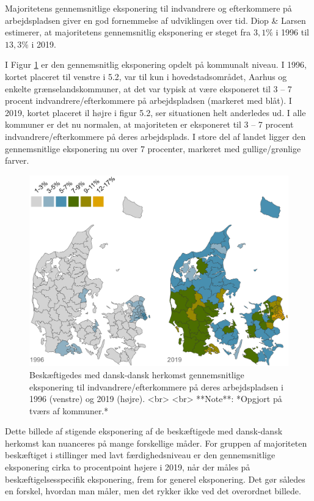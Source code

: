 \documentclass[
]{book}
\begin{document}
Majoritetens gennemsnitlige eksponering til indvandrere og efterkommere på arbejdspladsen giver en god fornemmelse af udviklingen over tid. Diop \& Larsen estimerer, at majoritetens gennemsnitlig eksponering er steget fra \(3,1\%\) i 1996 til \(13,3\%\) i 2019.

I Figur \ref{fig:fig-5-2} er den gennemsnitlig eksponering opdelt på kommunalt niveau. I 1996, kortet placeret til venstre i 5.2, var til kun i hovedstadsområdet, Aarhus og enkelte grænselandskommuner, at det var typisk at være eksponeret til 3 -- 7 procent indvandrere/efterkommere på arbejdspladsen (markeret med blåt). I 2019, kortet placeret il højre i figur 5.2, ser situationen helt anderledes ud. I alle kommuner er det nu normalen, at majoriteten er eksponeret til 3 -- 7 procent indvandrere/efterkommere på deres arbejdsplads. I store del af landet ligger den gennemsnitlige eksponering nu over 7 procenter, markeret med gullige/grønlige farver.

\begin{figure}
\includegraphics[width=1\linewidth]{images/Figur_4_1} \caption{Beskæftigedes med dansk-dansk herkomst gennemsnitlige eksponering til indvandrere/efterkommere på deres arbejdspladsen i 1996 (venstre) og 2019 (højre). <br> <br> **Note**: *Opgjort på tværs af kommuner.*}\label{fig:fig-5-2}
\end{figure}

Dette billede af stigende eksponering af de beskæftigede med dansk-dansk herkomst kan nuanceres på mange forskellige måder. For gruppen af majoriteten beskæftiget i stillinger med lavt færdighedsniveau er den gennemsnitlige eksponering cirka to procentpoint højere i 2019, når der måles på beskæftigelsesspecifik eksponering, frem for generel eksponering. Det gør således en forskel, hvordan man måler, men det rykker ikke ved det overordnet billede.
\end{document}
